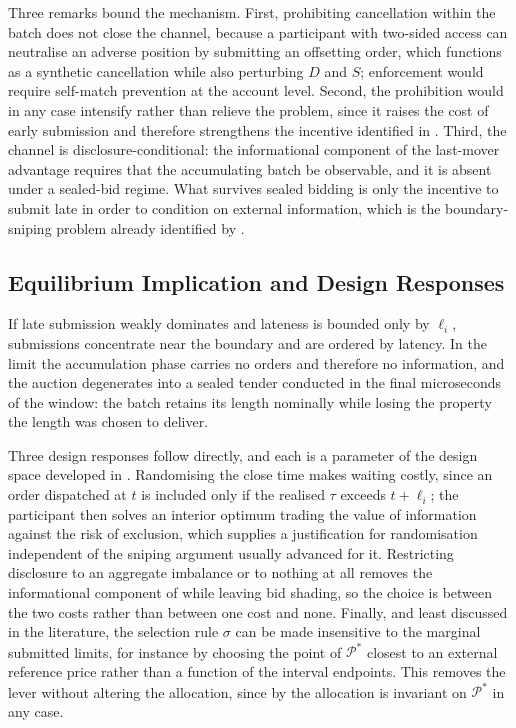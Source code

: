 Three remarks bound the mechanism. First, prohibiting cancellation
within the batch does not close the channel, because a participant with
two-sided access can neutralise an adverse position by submitting an
offsetting order, which functions as a synthetic cancellation while also
perturbing $D$ and $S$; enforcement would require self-match prevention
at the account level. Second, the prohibition would in any case
intensify rather than relieve the problem, since it raises the cost of
early submission and therefore strengthens the incentive identified in
. Third, the channel is disclosure-conditional: the
informational component of the last-mover advantage requires that the
accumulating batch be observable, and it is absent under a sealed-bid
regime. What survives sealed bidding is only the incentive to submit
late in order to condition on external information, which is the
boundary-sniping problem already identified by
\citet{budish2015high}.

\subsection{Equilibrium Implication and Design Responses}

If late submission weakly dominates and lateness is bounded only by
$\ell_i$, submissions concentrate near the boundary and are ordered by
latency. In the limit the accumulation phase carries no orders and
therefore no information, and the auction degenerates into a sealed
tender conducted in the final microseconds of the window: the batch
retains its length nominally while losing the property the length was
chosen to deliver.

Three design responses follow directly, and each is a parameter of the
design space developed in . Randomising the close time
makes waiting costly, since an order dispatched at $t$ is included only
if the realised $\tau$ exceeds $t + \ell_i$; the participant then solves
an interior optimum trading the value of information against the risk of
exclusion, which supplies a justification for randomisation independent
of the sniping argument usually advanced for it. Restricting disclosure
to an aggregate imbalance or to nothing at all removes the informational
component of  while leaving bid shading, so the
choice is between the two costs rather than between one cost and none.
Finally, and least discussed in the literature, the selection rule
$\sigma$ can be made insensitive to the marginal submitted limits, for
instance by choosing the point of $\mathcal{P}^{*}$ closest to an
external reference price rather than a function of the interval
endpoints. This removes the lever without altering the allocation, since
by  the allocation is invariant on $\mathcal{P}^{*}$
in any case.



